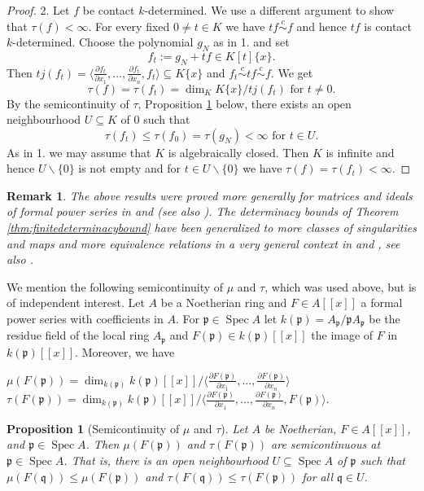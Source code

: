 \documentclass[11pt]{article}
\DeclareMathOperator{\Spec}{Spec}
\newtheorem{Remark}[Definition]{Remark}
\newtheorem{Proposition}[Definition]{Proposition }
\newcommand{\fp}{\mathfrak{p}}
\newcommand{\fq}{\mathfrak{q}}
\begin{document}
\begin{proof}
2. Let $f$ be contact  $k$-determined. We use a different argument to show that $\tau(f) < \infty$. 
 {For every fixed $ 0\ne t \in K$ we have  $tf\overset{c}{\sim} f$ and hence $tf$ is contact $k$-determined.
Choose the polynomial $g_N$ as in 1. and set
$$ f_t := g_N + t f \in K[t]\{x\}.$$
Then $tj(f_t) = \langle\frac {\partial f_t}{\partial x_1},...,\frac {\partial f_t}{\partial x_n}, f_t\rangle \subseteq K\{x\}$ and  
$f_t \overset{c}{\sim} tf \overset{c}{\sim} f$.} We get 
 $$\tau (f) = \tau (f_t) = \dim_K K\{x\}/tj(f_t) \text{ for } t\ne 0.$$ 
By the semicontinuity of $\tau$, Proposition \ref{prop.semcont}
 below,
there exists an open  neighbourhood $U \subseteq K$ of 0 such that  
$$\tau (f_t) \le \tau (f_0) = \tau(g_N) < \infty \text{ for } t \in U.$$
As in 1. we may assume that $K$ is algebraically closed. Then $K$ is infinite and hence $U\smallsetminus \{0\}$ is not empty and for $t \in U\smallsetminus \{0\}$ we have
$\tau(f) = \tau(f_t) < \infty$.
 \end{proof}

\begin{Remark} {\em
 The above results were proved more generally for matrices and ideals of formal power series in  \cite{GPh1} and  \cite{GPh2} (see also \cite[Section 3.1.3]{GLS25}). 
The determinacy bounds of Theorem \ref{thm:finitedeterminacybound} have
been generalized to more classes of singularities and maps and more equivalence relations in a very general context in \cite{BGK} and \cite{Ker}, see also \cite[Appendix A]{GLS25}.
}
\end{Remark}

We mention the following semicontinuity of $\mu$ and $\tau$, which was used above, but is of independent interest. Let $A$ be a Noetherian ring  and $F\in A[[x]]$ a formal power series with coefficients in $A$. For $\fp \in \Spec A$ let $k(\fp) = A_\fp/\fp A_\fp$ be the residue field of the local ring $A_\fp$ and $F(\fp) \in k(\fp)[[x]]$ the image of $F$ in $k(\fp)[[x]]$. Moreover, we have
\begin{center}
$\mu(F(\fp)) = \dim_{k(\fp)} k(\fp)[[x]]/\langle\frac {\partial F(\fp)}{\partial x_1},...,\frac {\partial F(\fp)}{\partial x_n}\rangle$\\
$\tau(F(\fp)) = \dim_{k(\fp)} k(\fp)[[x]]/\langle\frac {\partial F(\fp)}{\partial x_1},...,\frac {\partial F(\fp)}{\partial x_n}, F(\fp)\rangle.$
\end{center}

\begin{Proposition}[Semicontinuity of $\mu$ and $\tau$] 
\label{prop.semcont}
Let $A$ be Noetherian, $F\in A[[x]]$, and  $\fp \in \Spec A$. 
Then $\mu(F(\fp))$ and $\tau(F(\fp))$ are semicontinuous at $\fp \in \Spec A$. That is, there is an open neighbourhood $U \subseteq \Spec A$  of $\fp$ such that 
$\mu(F(\fq))\leq \mu(F(\fp))$   and $\tau(F(\fq))\leq \tau(F(\fp))$ for all  $\fq \in U$.
\end{Proposition}
\end{document}
